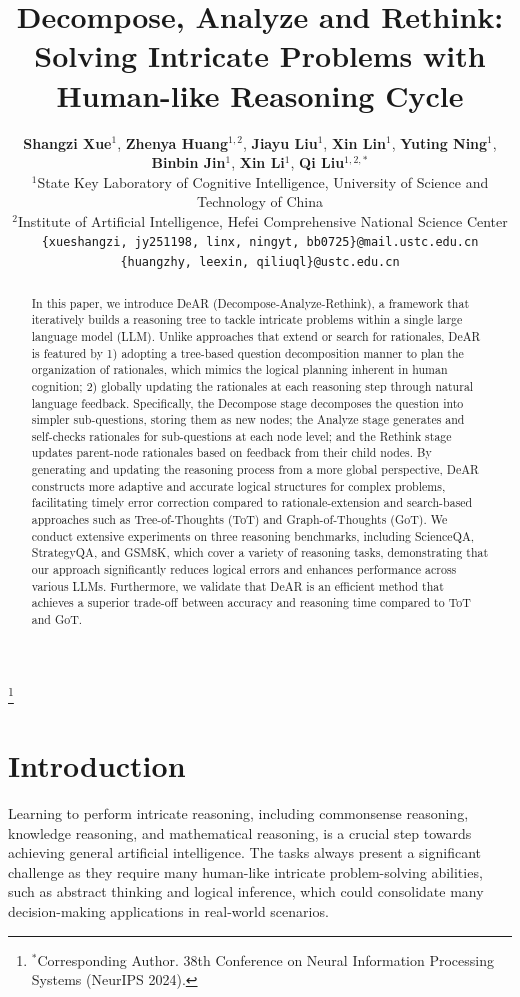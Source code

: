 \documentclass{article}
\title{\textbf{Decompose, Analyze and Rethink:\\ Solving Intricate Problems with Human-like Reasoning Cycle}}
\author{
  \textbf{Shangzi Xue}$^1$, \textbf{Zhenya Huang}$^{1,2}$, \textbf{Jiayu Liu}$^1$, \textbf{Xin Lin}$^1$, \textbf{Yuting Ning}$^1$,\\
  \textbf{Binbin Jin}$^1$, \textbf{Xin Li}$^1$, \textbf{Qi Liu}$^{1,2,*}$ \\[2mm]
  \small $^1$State Key Laboratory of Cognitive Intelligence, University of Science and Technology of China \\
  \small $^2$Institute of Artificial Intelligence, Hefei Comprehensive National Science Center \\
  \small \texttt{\{xueshangzi, jy251198, linx, ningyt, bb0725\}@mail.ustc.edu.cn} \\
  \small \texttt{\{huangzhy, leexin, qiliuql\}@ustc.edu.cn}
}
\date{}
\begin{document}
\maketitle

\begin{abstract}
In this paper, we introduce DeAR (Decompose-Analyze-Rethink), a framework that iteratively builds a reasoning tree to tackle intricate problems within a single large language model (LLM). Unlike approaches that extend or search for rationales, DeAR is featured by 1) adopting a tree-based question decomposition manner to plan the organization of rationales, which mimics the logical planning inherent in human cognition; 2) globally updating the rationales at each reasoning step through natural language feedback. Specifically, the Decompose stage decomposes the question into simpler sub-questions, storing them as new nodes; the Analyze stage generates and self-checks rationales for sub-questions at each node level; and the Rethink stage updates parent-node rationales based on feedback from their child nodes. By generating and updating the reasoning process from a more global perspective, DeAR constructs more adaptive and accurate logical structures for complex problems, facilitating timely error correction compared to rationale-extension and search-based approaches such as Tree-of-Thoughts (ToT) and Graph-of-Thoughts (GoT). We conduct extensive experiments on three reasoning benchmarks, including ScienceQA, StrategyQA, and GSM8K, which cover a variety of reasoning tasks, demonstrating that our approach significantly reduces logical errors and enhances performance across various LLMs. Furthermore, we validate that DeAR is an efficient method that achieves a superior trade-off between accuracy and reasoning time compared to ToT and GoT.
\end{abstract}

\let\thefootnote\relax\footnote{$^*$Corresponding Author. 38th Conference on Neural Information Processing Systems (NeurIPS 2024).}

\section{Introduction}
Learning to perform intricate reasoning, including commonsense reasoning, knowledge reasoning, and mathematical reasoning, is a crucial step towards achieving general artificial intelligence. The tasks always present a significant challenge as they require many human-like intricate problem-solving abilities, such as abstract thinking and logical inference, which could consolidate many decision-making applications in real-world scenarios.
\end{document}
